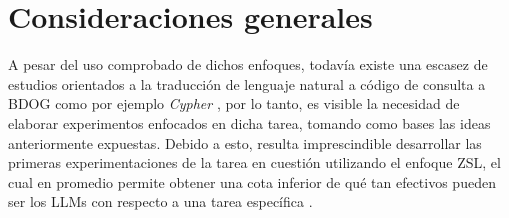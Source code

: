 \section{Consideraciones generales} \label{llm_approach_finetunig}

A pesar del uso comprobado de dichos enfoques, todavía existe una escasez de estudios orientados a la traducción de lenguaje natural a código de consulta a BDOG como por ejemplo \textit{Cypher} \cite{gpt4graphpaper2023}, por lo tanto, es visible la necesidad de elaborar experimentos enfocados en dicha tarea, tomando como bases las ideas anteriormente expuestas. Debido a esto, resulta imprescindible desarrollar las primeras experimentaciones de la tarea en cuestión utilizando el enfoque ZSL, el cual en promedio permite obtener una cota inferior de qué tan efectivos pueden ser los LLMs con respecto a una tarea específica \cite{}.


